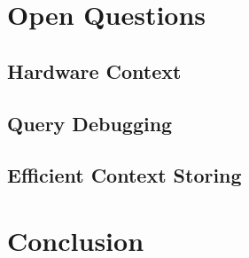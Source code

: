 \documentclass[runningheads]{llncs}
\begin{document}
\section{Open Questions} \label{sec:OPEN_QUESTIONS}
\subsection{Hardware Context}
\subsection{Query Debugging}
\subsection{Efficient Context Storing}

\section{Conclusion} \label{sec:CONCLUSION}



\end{document}
